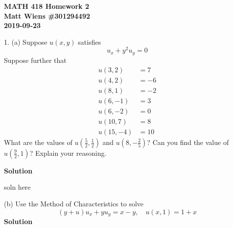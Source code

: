 \documentclass{article}
\begin{document}
\textbf{MATH 418 Homework 2} \\
\textbf{Matt Wiens \#301294492} \\
\textbf{2019-09-23}

1. (a) Suppose $u(x, y)$ satisfies
%
\begin{equation*}
    u_x+y^2 u_y = 0
\end{equation*}
%
Suppose further that
%
\begin{align*}
    u(3, 2) &= 7 \\
    u(4, 2) &= -6 \\
    u(8, 1) &= -2 \\
    u(6, -1) &= 3 \\
    u(6, -2) &= 0 \\
    u(10, 7) &= 8 \\
    u(15, -4) &= 10
\end{align*}
%
What are the values of $u\left(\frac{5}{2}, \frac{1}{2}\right)$ and
$u\left(8,-\frac{2}{5}\right)$? Can you find the value of
$u\left(\frac{9}{2},1\right)$? Explain your reasoning.

\textbf{Solution}

soln here

\vspace{5mm}

(b) Use the Method of Characteristics to solve
%
\begin{equation*}
    (y + u) u_x + y u_y = x - y, \quad u(x, 1) = 1 + x
\end{equation*}
%
\textbf{Solution}
\end{document}
